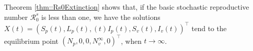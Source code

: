\begin{remark}
	Theorem \ref{thm::Rs0Extinction} shows that, if the basic stochastic
	reproductive number $\mathcal{R}^s_0$ is less than one, we have the 
	solutions $X(t)=(S_p (t), L_p (t), (t ) I_p (t), S_v (t), I_v (t))^{\top}$ 
	tend to the equilibrium point $(N_p, 0,0, N_v^{\infty}, 0)^{\top}$, 
	when $t\rightarrow \infty$.
\end{remark}